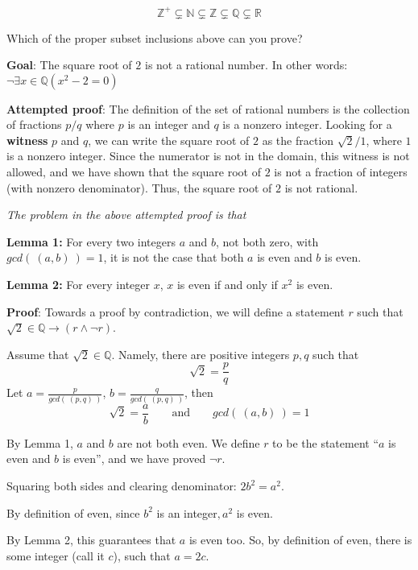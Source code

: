 \documentclass[12pt, oneside]{article}
\begin{document}
\[
    \mathbb{Z}^{+} \subsetneq \mathbb{N} \subsetneq \mathbb{Z} \subsetneq \mathbb{Q} \subsetneq \mathbb{R}
\]


Which of the proper subset inclusions above can you prove?

\vspace{50pt} 

{\bf Goal}:  The square root of $2$ is not a rational number.  In other words: $\neg \exists x \in \mathbb{Q} ( x^2 -  2 = 0)$

{\bf Attempted proof}: The definition of the set of rational numbers is the collection of fractions $p/q$ where $p$ is an integer and $q$ is a nonzero integer. Looking for a {\bf witness} $p$ and $q$, we can write the square root of $2$ as the fraction 
$\sqrt{2 }/1$, where $1$ is a nonzero integer. Since the numerator is not in the domain, this witness is not allowed, and we have shown that the square root of $2$ is not a fraction of integers (with nonzero denominator). Thus, the square root of $2$ is not rational.


{\it The problem in the above attempted proof is that} \underline{\phantom{it only considers one candidate witness
and does not prove that no witnesses exist.}}


{\bf Lemma 1:} For every two integers $a$ and  $b$, not both zero, with  $gcd(~(a,b)~) = 1$, it is not the case that both $a$
is  even and $b$ is even.


{\bf Lemma 2:} For every integer  $x$, $x$ is  even if and only if $x^2$  is even.


{\bf Proof}: Towards a proof by contradiction, we will define a statement 
$r$ such that $\sqrt{2} \in \mathbb{Q} \to (r \land \lnot r)$. 

Assume that $\sqrt{2} \in \mathbb{Q}$. Namely, there are positive integers
$p, q$ such that 
\[
    \sqrt{2} = \frac{p}{q}
\]
Let $a= \frac{p}{gcd( ~(p,q)~)}$, $b = \frac{q}{gcd(~(p,q)~)}$, then 
\[
    \sqrt{2} = \frac{a}{b} \qquad \text{and} \qquad gcd(~(a,b)~) = 1
\]

By Lemma 1, $a$ and $b$ are not both even. We define $r$ to be the 
statement ``$a$ is even and $b$ is even'', and we have proved $\lnot r$.

Squaring both sides and clearing denominator: $2b^2 = a^2$.

By definition of even, since $b^2$ is an integer$, a^2$ is even.

By Lemma 2, this guarantees that $a$ is even too. So, by 
definition of even, there is some integer (call it $c$), such that $a = 2c$.
\end{document}
